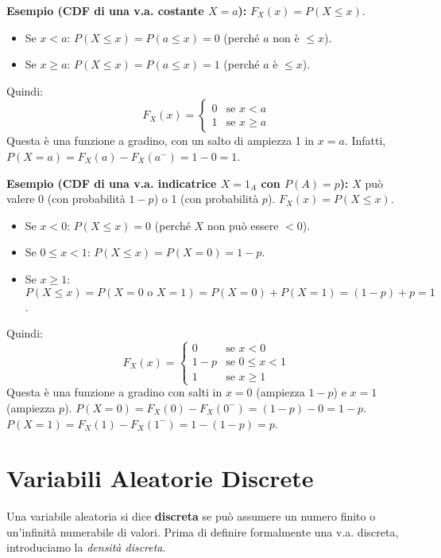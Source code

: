\begin{example}
\textbf{Esempio (CDF di una v.a. costante $X=a$):}
$F_X(x) = P(X \le x)$.
\begin{itemize}
    \item Se $x < a$: $P(X \le x) = P(a \le x) = 0$ (perché $a$ non è $\le x$).
    \item Se $x \ge a$: $P(X \le x) = P(a \le x) = 1$ (perché $a$ è $\le x$).
\end{itemize}
Quindi:
\[ F_X(x) = \begin{cases} 0 & \text{se } x < a \\ 1 & \text{se } x \ge a \end{cases} \]
Questa è una funzione a gradino, con un salto di ampiezza 1 in $x=a$. Infatti, $P(X=a) = F_X(a) - F_X(a^-) = 1 - 0 = 1$.
\end{example}

\begin{example}
\textbf{Esempio (CDF di una v.a. indicatrice $X=1_A$ con $P(A)=p$):}
$X$ può valere 0 (con probabilità $1-p$) o 1 (con probabilità $p$).
$F_X(x) = P(X \le x)$.
\begin{itemize}
    \item Se $x < 0$: $P(X \le x) = 0$ (perché $X$ non può essere $<0$).
    \item Se $0 \le x < 1$: $P(X \le x) = P(X=0) = 1-p$.
    \item Se $x \ge 1$: $P(X \le x) = P(X=0 \text{ o } X=1) = P(X=0) + P(X=1) = (1-p)+p = 1$.
\end{itemize}
Quindi:
\[ F_X(x) = \begin{cases} 0 & \text{se } x < 0 \\ 1-p & \text{se } 0 \le x < 1 \\ 1 & \text{se } x \ge 1 \end{cases} \]
Questa è una funzione a gradino con salti in $x=0$ (ampiezza $1-p$) e $x=1$ (ampiezza $p$).
$P(X=0) = F_X(0) - F_X(0^-) = (1-p) - 0 = 1-p$.
$P(X=1) = F_X(1) - F_X(1^-) = 1 - (1-p) = p$.
\end{example}

\chapter{Variabili Aleatorie Discrete}

Una variabile aleatoria si dice \textbf{discreta} se può assumere un numero finito o un'infinità numerabile di valori. Prima di definire formalmente una v.a. discreta, introduciamo la \textit{densità discreta}.

